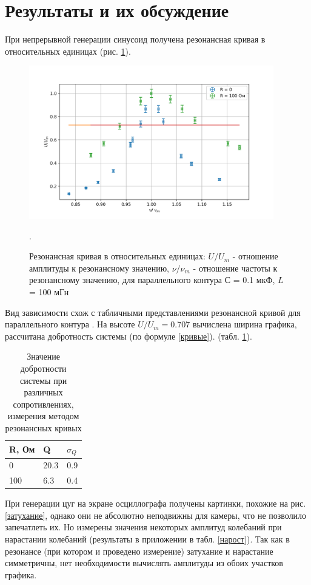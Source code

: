 \documentclass[a4paper,12pt]{article} %
\begin{document}
\section{Результаты и их обсуждение}
При непрерывной генерации синусоид получена резонансная кривая в относительных единицах (рис. \ref{график}). 

\begin{figure}[h!]
\begin{center}
\includegraphics[width=0.95\textwidth]{graf}
\caption{Резонансная кривая в относительных единицах: $U/U_m$ - отношение амплитуды к резонансному значению, $\nu/\nu_m$ - отношение частоты к резонансному значению, для параллельного контура $С $ = 0.1 мкФ, $L$ = 100 мГн} \label{график}.
\end{center}
\end{figure} 

Вид зависимости схож с табличными представлениями резонансной кривой для параллельного контура \cite{labnik}. На высоте $U/U_m = 0.707$ вычислена ширина графика, рассчитана добротность системы (по формуле \ref{кривые}). (табл. \ref{кривые_табл}).
\begin{table}[h!]
\caption{Значение добротности системы при различных сопротивлениях, измерения методом резонансных кривых}
\label{кривые_табл}
\begin{tabular}{|l|l|l|}
\hline
R, Ом & Q     & $\sigma_Q$ \\ \hline
0     & 20.3 & 0.9       \\ \hline
100   & 6.3  & 0.4       \\ \hline
\end{tabular}
\end{table}

При генерации цуг на экране осциллографа получены картинки, похожие на рис. \ref{затухание}, однако они не абсолютно неподвижны для камеры, что не позволило запечатлеть их. Но измерены значения некоторых амплитуд колебаний при нарастании колебаний (результаты в приложении в табл.  \ref{нарост}). Так как в резонансе (при котором и проведено измерение) затухание и нарастание симметричны, нет необходимости вычислять амплитуды из обоих участков графика.
\end{document}
